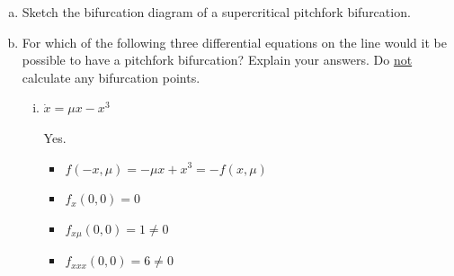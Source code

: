 \documentclass[12pt]{article}
\begin{document}
\begin{enumerate}[(a)]
    \item Sketch the bifurcation diagram of a supercritical pitchfork bifurcation.

          \begin{center}
          \end{center}

    \item For which of the following three differential equations on the line would it be possible to have a pitchfork bifurcation? Explain your answers. Do \underline{not} calculate any bifurcation points.
          \begin{enumerate}[(i)]
              \item \quad $\dot{x} = \mu x - x^3$

                    \color{blue}
                    Yes.
                    \begin{itemize}
                        \item $f(-x, \mu) = -\mu x + x^3 = -f(x, \mu)$
                        \item $f_x(0, 0) = 0$
                        \item $f_{x\mu}(0, 0) = 1 \neq 0$
                        \item $f_{xxx}(0, 0) = 6 \neq 0$
                    \end{itemize}
                    \color{black}


\end{enumerate}
\end{enumerate}
\end{document}
